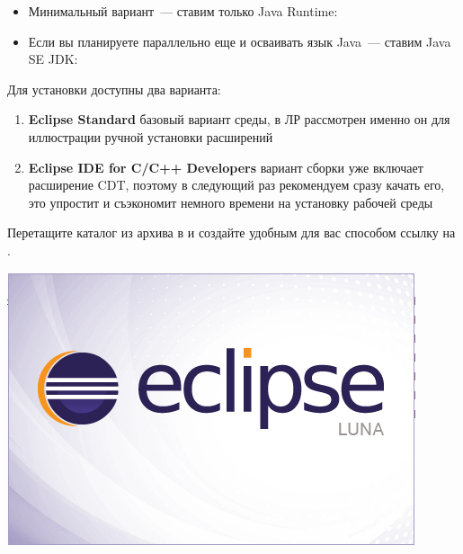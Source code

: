 \bigskip\begin{itemize}
  \item 
Минимальный вариант\ ---  ставим только Java Runtime:




  \item
Если вы планируете параллельно еще и осваивать язык Java\ --- ставим
Java SE JDK: 






\end{itemize}

Для установки доступны два варианта:
\begin{enumerate}
\item \textbf{Eclipse Standard} базовый вариант среды, в ЛР рассмотрен именно он для иллюстрации 
ручной установки расширений
\item \textbf{Eclipse IDE for C/C++ Developers} вариант сборки 
уже включает расширение CDT, поэтому в следующий раз рекомендуем сразу качать его,
это упростит и съэкономит немного времени на установку рабочей среды
\end{enumerate}

\bigskip{}

\bigskip{}

\bigskip Перетащите каталог  из архива в  и
создайте удобным для вас способом ссылку на .

\bigskip\includegraphics[height=0.3\textheight]{fig/EclipseSplash.png}

